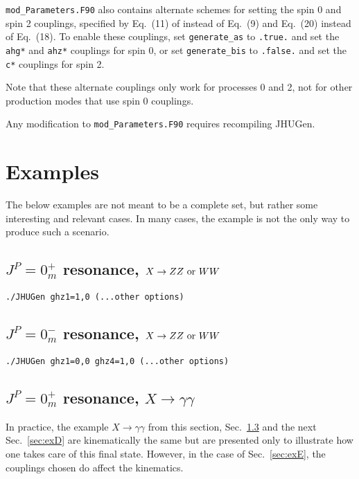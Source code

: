 \documentclass[aps,superscriptaddress,nofootinbib]{revtex4}
\begin{document}
\verb|mod_Parameters.F90| also contains alternate schemes for setting the spin 0 and spin 2 couplings, specified by Eq.~(11) of \cite{Bolognesi:2012} instead of Eq.~(9) and Eq.~(20) instead of Eq.~(18).  To enable these couplings, set \verb|generate_as| to \verb|.true.| and set the \verb|ahg*| and \verb|ahz*| couplings for spin 0, or set \verb|generate_bis| to \verb|.false.| and set the \verb|c*| couplings for spin 2.

Note that these alternate couplings only work for processes 0 and 2, not for other production modes that use spin 0 couplings.

Any modification to \verb|mod_Parameters.F90| requires recompiling JHUGen.

\section{Examples}

\noindent
The below examples are not meant to be a complete set, but rather some interesting and relevant cases.
In many cases, the example is not the only way to produce such a scenario.

\subsection{$J^P = 0^+_m$ resonance, $X \to ZZ~{\rm or}~WW$}
\label{sec:exA}

\begin{verbatim}
./JHUGen ghz1=1,0 (...other options)
\end{verbatim}

\subsection{$J^P = 0^-_m$ resonance, $X \to ZZ~{\rm or}~WW$}
\label{sec:exB}

\begin{verbatim}
./JHUGen ghz1=0,0 ghz4=1,0 (...other options)
\end{verbatim}

\subsection{$J^P = 0^+_m$ resonance, $X \to \gamma \gamma$}
\label{sec:exC}

In practice, the example $X \to \gamma \gamma$ from this section, Sec.~\ref{sec:exC} and the next Sec.~\ref{sec:exD} are
kinematically the same but are presented only to illustrate how one takes care of this final state.  However, in the case of Sec.~\ref{sec:exE}, the couplings chosen do affect the kinematics.
\end{document}
